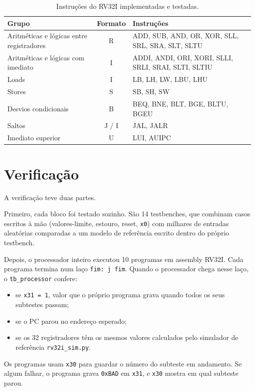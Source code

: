 \documentclass[11pt,a4paper]{article}
\begin{document}
\begin{table}[H]
  \centering
  \caption{Instruções do RV32I implementadas e testadas.}
  \begin{tabularx}{\textwidth}{lcY}
    \toprule
    Grupo & Formato & Instruções \\
    \midrule
    Aritméticas e lógicas entre registradores & R & ADD, SUB, AND, OR, XOR, SLL, SRL, SRA, SLT, SLTU \\
    Aritméticas e lógicas com imediato & I & ADDI, ANDI, ORI, XORI, SLLI, SRLI, SRAI, SLTI, SLTIU \\
    Loads & I & LB, LH, LW, LBU, LHU \\
    Stores & S & SB, SH, SW \\
    Desvios condicionais & B & BEQ, BNE, BLT, BGE, BLTU, BGEU \\
    Saltos & J / I & JAL, JALR \\
    Imediato superior & U & LUI, AUIPC \\
    \bottomrule
  \end{tabularx}
\end{table}

\section{Verificação}

A verificação teve duas partes.

Primeiro, cada bloco foi testado sozinho. São 14 testbenches, que combinam casos escritos à
mão (valores-limite, estouro, reset, \texttt{x0}) com milhares de entradas aleatórias
comparadas a um modelo de referência escrito dentro do próprio testbench.

Depois, o processador inteiro executou 10 programas em assembly RV32I. Cada programa termina
num laço \texttt{fim: j fim}. Quando o processador chega nesse laço, o \texttt{tb\_processor}
confere:

\begin{itemize}
  \item se \texttt{x31 = 1}, valor que o próprio programa grava quando todos os seus subtestes passam;
  \item se o PC parou no endereço esperado;
  \item se os 32 registradores têm os mesmos valores calculados pelo simulador de referência
        \texttt{rv32i\_sim.py}.
\end{itemize}

Os programas usam \texttt{x30} para guardar o número do subteste em andamento. Se algum falhar,
o programa grava \texttt{0xBAD} em \texttt{x31}, e \texttt{x30} mostra em qual subteste parou.
\end{document}
